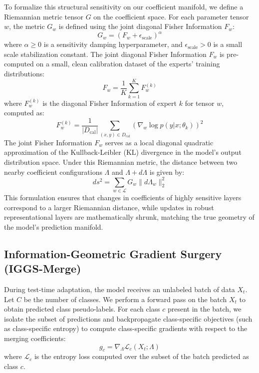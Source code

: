 \documentclass{article}
\theoremstyle{plain}
\theoremstyle{definition}
\theoremstyle{remark}
\begin{document}
To formalize this structural sensitivity on our coefficient manifold, we define a Riemannian metric tensor $G$ on the coefficient space. For each parameter tensor $w$, the metric $G_w$ is defined using the joint diagonal Fisher Information $F_w$:
\begin{equation}
    G_w = (F_w + \epsilon_{\text{scale}})^{\alpha}
\end{equation}
where $\alpha \geq 0$ is a sensitivity damping hyperparameter, and $\epsilon_{\text{scale}} > 0$ is a small scale stabilization constant. The joint diagonal Fisher Information $F_w$ is pre-computed on a small, clean calibration dataset of the experts' training distributions:
\begin{equation}
    F_w = \frac{1}{K} \sum_{k=1}^K F^{(k)}_w
\end{equation}
where $F^{(k)}_w$ is the diagonal Fisher Information of expert $k$ for tensor $w$, computed as:
\begin{equation}
    F^{(k)}_w = \frac{1}{|D_{\text{cal}}|} \sum_{(x, y) \in D_{\text{cal}}} \left( \nabla_w \log p(y | x; \theta_k) \right)^2
\end{equation}
The joint Fisher Information $F_w$ serves as a local diagonal quadratic approximation of the Kullback-Leibler (KL) divergence in the model's output distribution space. Under this Riemannian metric, the distance between two nearby coefficient configurations $\Lambda$ and $\Lambda + d\Lambda$ is given by:
\begin{equation}
    ds^2 = \sum_{w \in \mathcal{L}} G_w \|d\Lambda_w\|_2^2
\end{equation}
This formulation ensures that changes in coefficients of highly sensitive layers correspond to a larger Riemannian distance, while updates in robust representational layers are mathematically shrunk, matching the true geometry of the model's prediction manifold.

\subsection{Information-Geometric Gradient Surgery (IGGS-Merge)}
During test-time adaptation, the model receives an unlabeled batch of data $X_t$. Let $C$ be the number of classes. We perform a forward pass on the batch $X_t$ to obtain predicted class pseudo-labels. For each class $c$ present in the batch, we isolate the subset of predictions and backpropagate class-specific objectives (such as class-specific entropy) to compute class-specific gradients with respect to the merging coefficients:
\begin{equation}
    g_c = \nabla_{\Lambda} \mathcal{L}_c(X_t; \Lambda)
    \label{eq:class_grad}
\end{equation}
where $\mathcal{L}_c$ is the entropy loss computed over the subset of the batch predicted as class $c$.
\end{document}
